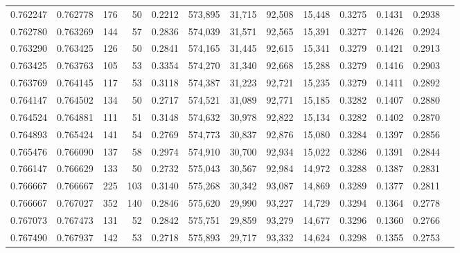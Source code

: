\begin{tabular}{rrrrrrrrrrrrr}
0.762247 & 0.762778 &    176 &    50 &                                     0.2212 & 573,895 &  31,715 &  92,508 &  15,448 & 0.3275 & 0.1431 & 0.2938 \\
0.762780 & 0.763269 &    144 &    57 &                                     0.2836 & 574,039 &  31,571 &  92,565 &  15,391 & 0.3277 & 0.1426 & 0.2924 \\
0.763290 & 0.763425 &    126 &    50 &                                     0.2841 & 574,165 &  31,445 &  92,615 &  15,341 & 0.3279 & 0.1421 & 0.2913 \\
0.763425 & 0.763763 &    105 &    53 &                                     0.3354 & 574,270 &  31,340 &  92,668 &  15,288 & 0.3279 & 0.1416 & 0.2903 \\
0.763769 & 0.764145 &    117 &    53 &                                     0.3118 & 574,387 &  31,223 &  92,721 &  15,235 & 0.3279 & 0.1411 & 0.2892 \\
0.764147 & 0.764502 &    134 &    50 &                                     0.2717 & 574,521 &  31,089 &  92,771 &  15,185 & 0.3282 & 0.1407 & 0.2880 \\
0.764524 & 0.764881 &    111 &    51 &                                     0.3148 & 574,632 &  30,978 &  92,822 &  15,134 & 0.3282 & 0.1402 & 0.2870 \\
0.764893 & 0.765424 &    141 &    54 &                                     0.2769 & 574,773 &  30,837 &  92,876 &  15,080 & 0.3284 & 0.1397 & 0.2856 \\
0.765476 & 0.766090 &    137 &    58 &                                     0.2974 & 574,910 &  30,700 &  92,934 &  15,022 & 0.3286 & 0.1391 & 0.2844 \\
0.766147 & 0.766629 &    133 &    50 &                                     0.2732 & 575,043 &  30,567 &  92,984 &  14,972 & 0.3288 & 0.1387 & 0.2831 \\
0.766667 & 0.766667 &    225 &   103 &                                     0.3140 & 575,268 &  30,342 &  93,087 &  14,869 & 0.3289 & 0.1377 & 0.2811 \\
0.766667 & 0.767027 &    352 &   140 &                                     0.2846 & 575,620 &  29,990 &  93,227 &  14,729 & 0.3294 & 0.1364 & 0.2778 \\
0.767073 & 0.767473 &    131 &    52 &                                     0.2842 & 575,751 &  29,859 &  93,279 &  14,677 & 0.3296 & 0.1360 & 0.2766 \\
0.767490 & 0.767937 &    142 &    53 &                                     0.2718 & 575,893 &  29,717 &  93,332 &  14,624 & 0.3298 & 0.1355 & 0.2753 \\

\end{tabular}
